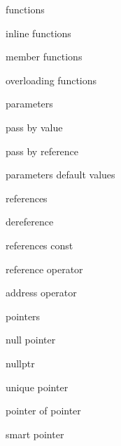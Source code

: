          functions
        
         inline functions
        
         member functions

        overloading functions
        
         parameters
        
         pass by value
        
         pass by reference

         parameters default values 
        
         references 
        
         dereference 
        
         references const 
        
         reference operator 
        
         address operator 
        
         pointers
        
         null pointer
        
         nullptr
        
         unique pointer
        
         pointer of pointer
        
         smart pointer
        
